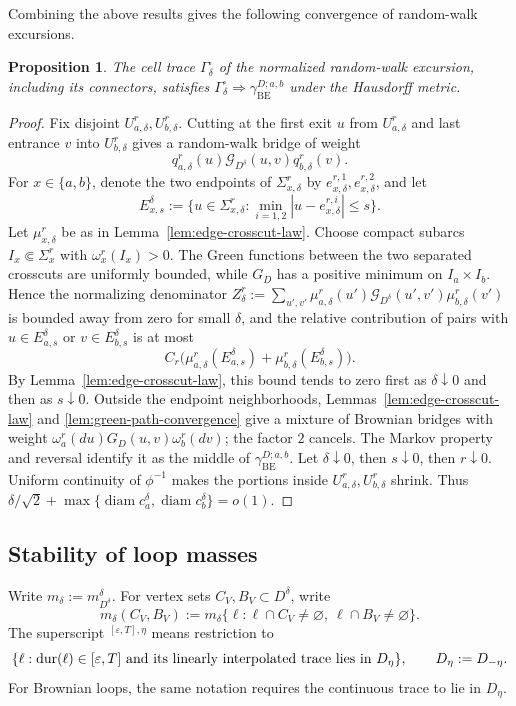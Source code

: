 \documentclass[11pt]{article}
\numberwithin{equation}{section}
\newcommand{\1}{\mathbf{1}}
\newcommand{\BE}{\mathrm{BE}}
\newtheorem{proposition}[theorem]{Proposition}
\newcommand{\diam}{\operatorname{diam}}
\newcommand{\Gc}{\mathcal G}
\begin{document}
Combining the above results gives the following convergence of random-walk excursions.
\begin{proposition}
\label{prop:excursion-convergence}
The cell trace \(\Gamma_\delta^\square\) of the normalized
random-walk excursion, including its connectors, satisfies $\Gamma_\delta^\square\Longrightarrow\gamma_{\BE}^{D;a,b}$
under the Hausdorff metric.
\end{proposition}
\begin{proof}
Fix disjoint \(U_{a,\delta}^r,U_{b,\delta}^r\).  Cutting at the first exit
\(u\) from \(U_{a,\delta}^r\) and last entrance \(v\) into
\(U_{b,\delta}^r\) gives a random-walk bridge of weight
\[
 q_{a,\delta}^r(u)\Gc_{D^\delta}(u,v)q_{b,\delta}^r(v).
\]
For \(x\in\{a,b\}\), denote the two endpoints of
\(\Sigma_{x,\delta}^r\) by \(e_{x,\delta}^{r,1},e_{x,\delta}^{r,2}\), and let
\[
 E_{x,s}^\delta:=\{u\in\Sigma_{x,\delta}^r:
 \min_{i=1,2}|u-e_{x,\delta}^{r,i}|\leq s\}.
\]
Let \(\mu_{x,\delta}^r\) be as in
Lemma~\ref{lem:edge-crosscut-law}.  Choose compact subarcs
\(I_x\Subset\Sigma_x^r\) with \(\omega_x^r(I_x)>0\).  The Green functions
between the two separated crosscuts are uniformly bounded, while
\(G_D\) has a positive minimum on \(I_a\times I_b\).  Hence the normalizing
denominator $Z_\delta^r:=\sum_{u',v'}\mu_{a,\delta}^r(u')
 \Gc_{D^\delta}(u',v')\mu_{b,\delta}^r(v')$ is bounded away from zero for small \(\delta\), and the
relative contribution of pairs with
\(u\in E_{a,s}^\delta\) or \(v\in E_{b,s}^\delta\) is at most
\[
 C_r\bigl(\mu_{a,\delta}^r(E_{a,s}^\delta)
          +\mu_{b,\delta}^r(E_{b,s}^\delta)\bigr).
\]
By Lemma~\ref{lem:edge-crosscut-law}, this bound tends to zero first as
\(\delta\downarrow0\) and then as \(s\downarrow0\).  Outside the endpoint
neighborhoods,
Lemmas~\ref{lem:edge-crosscut-law} and
\ref{lem:green-path-convergence} give a mixture of Brownian bridges
with weight \(\omega_a^r(du)G_D(u,v)\omega_b^r(dv)\); the factor \(2\)
cancels.  The Markov property and reversal identify it as the middle of
\(\gamma_{\BE}^{D;a,b}\).  Let \(\delta\downarrow0\), then \(s\downarrow0\), then
\(r\downarrow0\).  Uniform continuity of
\(\phi^{-1}\) makes the portions inside \(U_{a,\delta}^r,U_{b,\delta}^r\)
shrink.  Thus \(\delta/\sqrt2+
 \max\{\diam c_a^\delta,\diam c_b^\delta\}=o(1)\).
\end{proof}
\subsection{Stability of loop masses}
\label{subsec:continuum-loop-mass}
Write \(m_\delta:=m_{D^\delta}^\delta\).
For vertex sets \(C_V,B_V\subset D^\delta\), write
\[
 m_\delta(C_V,B_V)
 :=m_\delta\{\ell:\ell\cap C_V\ne\varnothing,
                    \ \ell\cap B_V\ne\varnothing\}.
\]
The superscript \({}^{[\varepsilon,T],\eta}\) means restriction to \[
 \{\ell:\operatorname{dur}(\ell)\in[\varepsilon,T]
          \ \hbox{and its linearly interpolated trace lies in }D_\eta\},
 \qquad
 D_\eta:=D_{-\eta}.
\]
For Brownian loops, the same notation requires the continuous trace to lie in \(D_\eta\).
\end{document}

